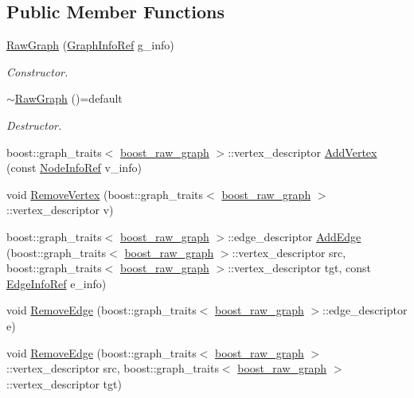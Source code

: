 \subsection*{Public Member Functions}
\begin{DoxyCompactItemize}
\item 
\hyperlink{structRawGraph_aa87e399ff7cf75bb36c18f28694188e2}{Raw\+Graph} (\hyperlink{graph__info_8hpp_a4a5c364c379e5139b7dc97e7e69c7da3}{Graph\+Info\+Ref} g\+\_\+info)
\begin{DoxyCompactList}\small\item\em Constructor. \end{DoxyCompactList}\item 
\hyperlink{structRawGraph_af9945c60018468ccc8071aee7dde6933}{$\sim$\+Raw\+Graph} ()=default
\begin{DoxyCompactList}\small\item\em Destructor. \end{DoxyCompactList}\item 
boost\+::graph\+\_\+traits$<$ \hyperlink{graph_8hpp_afdae34b3d2ab29778d96da05f66add5c}{boost\+\_\+raw\+\_\+graph} $>$\+::vertex\+\_\+descriptor \hyperlink{structRawGraph_ade8aabe1902c1e01ce11c0f62defd2e2}{Add\+Vertex} (const \hyperlink{node__info_8hpp_a345f052eed4efe04f7848fd0ebd015b2}{Node\+Info\+Ref} v\+\_\+info)
\item 
void \hyperlink{structRawGraph_ad29ce2e412851ac0b1e9e40aeb8cac1f}{Remove\+Vertex} (boost\+::graph\+\_\+traits$<$ \hyperlink{graph_8hpp_afdae34b3d2ab29778d96da05f66add5c}{boost\+\_\+raw\+\_\+graph} $>$\+::vertex\+\_\+descriptor v)
\item 
boost\+::graph\+\_\+traits$<$ \hyperlink{graph_8hpp_afdae34b3d2ab29778d96da05f66add5c}{boost\+\_\+raw\+\_\+graph} $>$\+::edge\+\_\+descriptor \hyperlink{structRawGraph_a5da66a6913553ac02de8405f98c0089a}{Add\+Edge} (boost\+::graph\+\_\+traits$<$ \hyperlink{graph_8hpp_afdae34b3d2ab29778d96da05f66add5c}{boost\+\_\+raw\+\_\+graph} $>$\+::vertex\+\_\+descriptor src, boost\+::graph\+\_\+traits$<$ \hyperlink{graph_8hpp_afdae34b3d2ab29778d96da05f66add5c}{boost\+\_\+raw\+\_\+graph} $>$\+::vertex\+\_\+descriptor tgt, const \hyperlink{edge__info_8hpp_a65ddc964b1738667fc720f0de33aeef9}{Edge\+Info\+Ref} e\+\_\+info)
\item 
void \hyperlink{structRawGraph_a9537d6d1e88f11128a60d9f48dc2f32a}{Remove\+Edge} (boost\+::graph\+\_\+traits$<$ \hyperlink{graph_8hpp_afdae34b3d2ab29778d96da05f66add5c}{boost\+\_\+raw\+\_\+graph} $>$\+::edge\+\_\+descriptor e)
\item 
void \hyperlink{structRawGraph_aec71822f026381203f4a3fc7414353a0}{Remove\+Edge} (boost\+::graph\+\_\+traits$<$ \hyperlink{graph_8hpp_afdae34b3d2ab29778d96da05f66add5c}{boost\+\_\+raw\+\_\+graph} $>$\+::vertex\+\_\+descriptor src, boost\+::graph\+\_\+traits$<$ \hyperlink{graph_8hpp_afdae34b3d2ab29778d96da05f66add5c}{boost\+\_\+raw\+\_\+graph} $>$\+::vertex\+\_\+descriptor tgt)
\end{DoxyCompactItemize}


